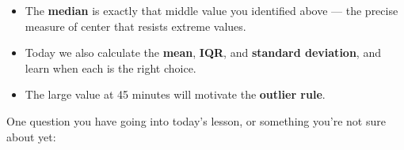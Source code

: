 \documentclass[10pt]{article}
\begin{document}
\vspace{0.14in}

\begin{tcolorbox}[colback=greenbg, colframe=greenacc, boxrule=0.8pt, arc=2mm,
    left=4mm, right=4mm, top=3mm, bottom=3mm]
\small
\begin{itemize}[leftmargin=1.3em, itemsep=5pt]
  \item The \textbf{median} is exactly that middle value you identified above ---
        the precise measure of center that resists extreme values.
  \item Today we also calculate the \textbf{mean}, \textbf{IQR}, and
        \textbf{standard deviation}, and learn when each is the right choice.
  \item The large value at 45 minutes will motivate the \textbf{outlier rule}.
\end{itemize}
\end{tcolorbox}

\vspace{0.12in}

\noindent\textcolor{slate}{\small One question you have going into today's lesson,
or something you're not sure about yet:}\\[8pt]
\writeline
\end{document}
